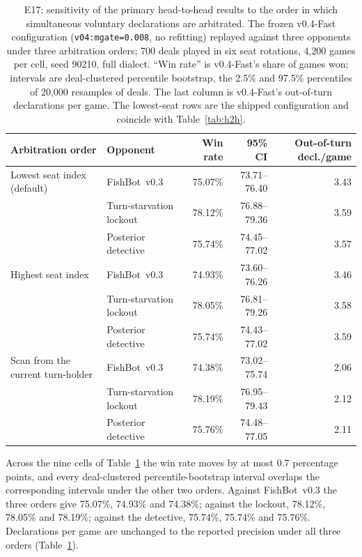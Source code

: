 \documentclass[11pt]{article}
\theoremstyle{definition}
\DeclareRobustCommand{\vfast}{\texorpdfstring{\mbox{v0.4-Fast}}{v0.4-Fast}}
\DeclareRobustCommand{\vthree}{\texorpdfstring{\mbox{FishBot v0.3}}{FishBot v0.3}}
\newcommand{\numHtHGames}{4{,}200}
\newcommand{\numVsVthree}{75.07}
\newcommand{\numVsLockout}{78.12}
\newcommand{\numVsDetective}{75.74}
\newcommand{\numBootstrapDraws}{20{,}000}
\newcommand{\numEseventeenDeals}{700}
\newcommand{\numArbHighVthree}{74.93}
\newcommand{\numArbTurnVthree}{74.38}
\newcommand{\numArbHighLockout}{78.05}
\newcommand{\numArbTurnLockout}{78.19}
\newcommand{\numArbHighDetective}{75.74}
\newcommand{\numArbTurnDetective}{75.76}
\newcommand{\numArbMaxMove}{0.7}
\begin{document}
\begin{table}[ht]
\centering
\caption{E17: sensitivity of the primary head-to-head results to the order in
which simultaneous voluntary declarations are arbitrated. The frozen \vfast{}
configuration (\texttt{v04:mgate=0.008}, no refitting) replayed against three
opponents under three arbitration orders; \numEseventeenDeals{} deals played in
six seat rotations, \numHtHGames{} games per cell, seed 90210, full dialect.
``Win rate'' is \vfast{}'s share of games won; intervals are deal-clustered
percentile bootstrap, the 2.5\% and 97.5\% percentiles of \numBootstrapDraws{}
resamples of deals. The last column is \vfast{}'s out-of-turn declarations per
game. The lowest-seat rows are the shipped configuration and coincide with
Table~\ref{tab:h2h}.}
\label{tab:arbitration}
\small
\begin{tabular}{llrrr}
\toprule
Arbitration order & Opponent & Win rate & 95\% CI & Out-of-turn decl./game \\
\midrule
Lowest seat index (default) & \vthree{} & 75.07\% & 73.71--76.40 & 3.43 \\
 & Turn-starvation lockout & 78.12\% & 76.88--79.36 & 3.59 \\
 & Posterior detective & 75.74\% & 74.45--77.02 & 3.57 \\
Highest seat index & \vthree{} & 74.93\% & 73.60--76.26 & 3.46 \\
 & Turn-starvation lockout & 78.05\% & 76.81--79.26 & 3.58 \\
 & Posterior detective & 75.74\% & 74.43--77.02 & 3.59 \\
Scan from the current turn-holder & \vthree{} & 74.38\% & 73.02--75.74 & 2.06 \\
 & Turn-starvation lockout & 78.19\% & 76.95--79.43 & 2.12 \\
 & Posterior detective & 75.76\% & 74.48--77.05 & 2.11 \\
\bottomrule
\end{tabular}%
\end{table}

Across the nine cells of Table~\ref{tab:arbitration} the win rate moves by at
most \numArbMaxMove{} percentage points, and every deal-clustered
percentile-bootstrap interval overlaps the corresponding intervals under the
other two orders. Against \vthree{} the three orders give \numVsVthree\%,
\numArbHighVthree\% and \numArbTurnVthree\%; against the lockout,
\numVsLockout\%, \numArbHighLockout\% and \numArbTurnLockout\%; against the
detective, \numVsDetective\%, \numArbHighDetective\% and
\numArbTurnDetective\%. Declarations per game are unchanged to the reported
precision under all three orders (Table~\ref{tab:arbitration}).
\end{document}
